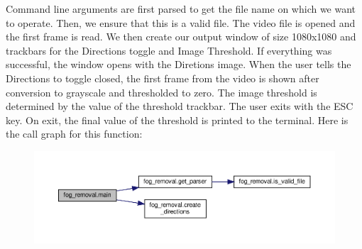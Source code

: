 Command line arguments are first parsed to get the file name on which we want to operate. Then, we ensure that this is a valid file. The video file is opened and the first frame is read. We then create our output window of size 1080x1080 and trackbars for the Directions toggle and Image Threshold. If everything was successful, the window opens with the Diretions image. When the user tells the Directions to toggle closed, the first frame from the video is shown after conversion to grayscale and thresholded to zero. The image threshold is determined by the value of the threshold trackbar. The user exits with the E\+SC key. On exit, the final value of the threshold is printed to the terminal. Here is the call graph for this function\+:
\nopagebreak
\begin{figure}[H]
\begin{center}
\leavevmode
\includegraphics[width=350pt]{namespacefog__removal_a427a577da8405e5624962d7ef722aadf_cgraph}
\end{center}
\end{figure}
